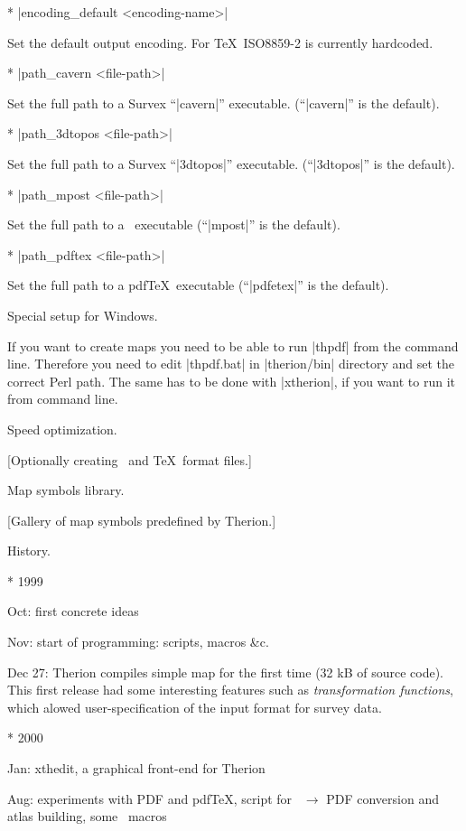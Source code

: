 \list
* |encoding_default <encoding-name>|

        Set the default output encoding. For \TeX\ ISO8859-2 is currently
        hardcoded.
        
* |path_cavern <file-path>|

        Set the full path to a Survex ``|cavern|'' executable. (``|cavern|'' is the default).
        
* |path_3dtopos <file-path>|

        Set the full path to a Survex ``|3dtopos|'' executable. (``|3dtopos|'' is the default).

* |path_mpost <file-path>|

        Set the full path to a \MP\ executable (``|mpost|'' is the default).

* |path_pdftex <file-path>|

        Set the full path to a pdf\TeX\ executable (``|pdfetex|'' is the default).
\endlist

\subsubchapter Special setup for Windows.

If you want to create maps you need to be able to run |thpdf| from the command
line. Therefore you need to edit |thpdf.bat| in |therion/bin| directory and
set the correct Perl path. The same has to be done with |xtherion|,
if you want to run it from command line. 

\subsubchapter Speed optimization.

[Optionally creating \MP\ and \TeX\ format files.]


\subchapter Map symbols library.

[Gallery of map symbols predefined by Therion.]


\subchapter History.

\list
* 1999

  Oct: first concrete ideas

  Nov: start of programming: scripts, macros \&c.

  Dec 27: Therion compiles simple map for the first time
       (32 kB of source code). This first release had some interesting features
       such as {\it transformation functions}, which alowed user-specification
       of the input format for survey data.
				
* 2000

  Jan: xthedit, a graphical front-end for Therion

  Aug: experiments with PDF and pdf\TeX, script for \MP\ $\to$ PDF conversion and
       atlas building, some \MP\ macros

